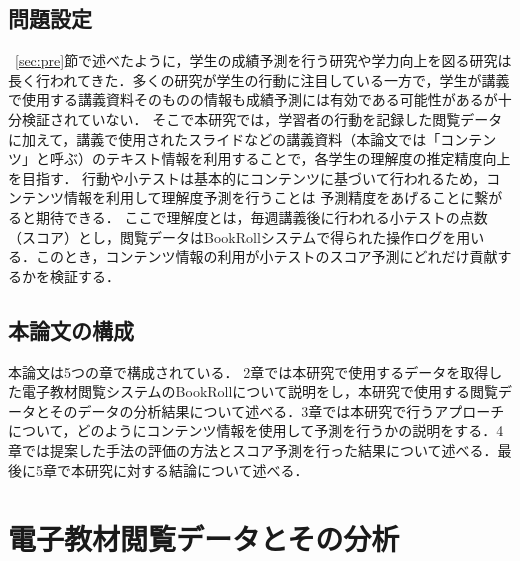 \documentclass[a4paper,12pt]{ltjsreport}
\begin{document}



\section{問題設定}\label{sec:mondai}

~\ref{sec:pre}節で述べたように，学生の成績予測を行う研究や学力向上を図る研究は長く行われてきた．多くの研究が学生の行動に注目している一方で，学生が講義で使用する講義資料そのものの情報も成績予測には有効である可能性があるが十分検証されていない．
そこで本研究では，学習者の行動を記録した閲覧データに加えて，講義で使用されたスライドなどの講義資料（本論文では「コンテンツ」と呼ぶ）のテキスト情報を利用することで，各学生の理解度の推定精度向上を目指す．
行動や小テストは基本的にコンテンツに基づいて行われるため，コンテンツ情報を利用して理解度予測を行うことは
予測精度をあげることに繋がると期待できる．
ここで理解度とは，毎週講義後に行われる小テストの点数（スコア）とし，閲覧データはBookRollシステムで得られた操作ログを用いる．このとき，コンテンツ情報の利用が小テストのスコア予測にどれだけ貢献するかを検証する．

\section{本論文の構成}\label{sec:kousei}

本論文は5つの章で構成されている．
2章では本研究で使用するデータを取得した電子教材閲覧システムのBookRollについて説明をし，本研究で使用する閲覧データとそのデータの分析結果について述べる．3章では本研究で行うアプローチについて，どのようにコンテンツ情報を使用して予測を行うかの説明をする．4章では提案した手法の評価の方法とスコア予測を行った結果について述べる．最後に5章で本研究に対する結論について述べる．

\chapter{電子教材閲覧データとその分析}
\end{document}
